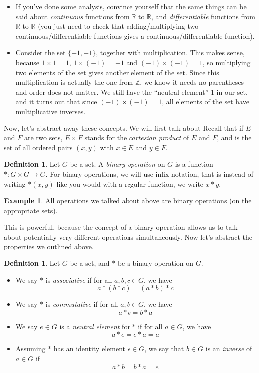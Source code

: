 \documentclass{book}
\newcommand{\Z}{\mathbb{Z}}
\newcommand{\R}{\mathbb{R}}
\theoremstyle{plain}
\theoremstyle{definition}
\newtheorem{definition}[theorem]{Definition}
\newtheorem{example}[theorem]{Example}
\theoremstyle{remark}
\begin{document}
\begin{itemize}
    \item If you've done some analysis, convince yourself that the same things can be said about \emph{continuous} functions from $\R$ to $\R$, and \emph{differentiable} functions from $\R$ to $\R$ (you just need to check that adding/multiplying two continuous/differentiable functions gives a continuous/differentiable function).
    \item Consider the set $\{+1, -1\}$, together with multiplication. This makes sense, because $1 \times 1 = 1$, $1\times(-1) = -1$ and $(-1)\times(-1) = 1$, so multiplying two elements of the set gives another element of the set. Since this multiplication is actually the one from $\Z$, we know it needs no parentheses and order does not matter. We still have the ``neutral element'' $1$ in our set, and it turns out that since $(-1)\times(-1) = 1$, all elements of the set have multiplicative inverses.
\end{itemize}

Now, let's abstract away these concepts. We will first talk about  Recall that if $E$ and $F$ are two sets, $E \times F$ stands for the \emph{cartesian product} of $E$ and $F$, and is the set of all ordered pairs $(x,y)$ with $x \in E$ and $y \in F$.

\begin{definition}
    Let $G$ be a set. A \emph{binary operation} on $G$ is a function $* : G \times G \to G$. For binary operations, we will use infix notation, that is instead of writing $*(x,y)$ like you would with a regular function, we write $x * y$.
\end{definition}

\begin{example}
    All operations we talked about above are binary operations (on the appropriate sets).
\end{example}

This is powerful, because the concept of a binary operation allows us to talk about potentially very different operations simultaneously. Now let's abstract the properties we outlined above.

\begin{definition}
    Let $G$ be a set, and $*$ be a binary operation on $G$.
    \begin{itemize}
        \item We say $*$ is \emph{associative} if for all $a,b,c \in G$, we have
        \[a * (b * c) = (a*b)*c\]
        \item We say $*$ is \emph{commutative} if for all $a,b \in G$, we have
        \[a*b = b*a\]
        \item We say $e \in G$ is a \emph{neutral element} for $*$ if for all $a \in G$, we have
        \[a * e = e * a = a\]
        \item Assuming $*$ has an identity element $e \in G$, we say that $b \in G$ is an \emph{inverse} of $a \in G$ if
        \[a*b = b*a = e\]
    \end{itemize}
\end{definition}
\end{document}
